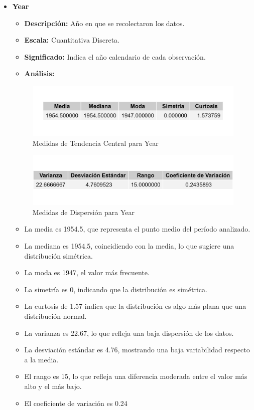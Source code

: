 \documentclass{article}
\begin{document}
\begin{itemize}
    \item \textbf{Year}
    \begin{itemize}
        \item \textbf{Descripción:} Año en que se recolectaron los datos.
        \item \textbf{Escala:} Cuantitativa Discreta.
        \item \textbf{Significado:} Indica el año calendario de cada observación.
        \item \textbf{Análisis:} 
    \end{itemize}
    \begin{figure}[H]
        \centering
        \includegraphics[width=\textwidth]{MTC/Year_central.png}
        \caption{Medidas de Tendencia Central para Year}
    \end{figure}
    \begin{figure}[H]
        \centering
        \includegraphics[width=\textwidth]{MTC/Year_dispersion.png}
        \caption{Medidas de Dispersión para Year}
    \end{figure}
            \begin{itemize}
                \item La media es 1954.5, que representa el punto medio del período analizado.
                \item La mediana es 1954.5, coincidiendo con la media, lo que sugiere una distribución simétrica.
                \item La moda es 1947, el valor más frecuente.
                \item La simetría es 0, indicando que la distribución es simétrica.
                \item La curtosis de 1.57 indica que la distribución es algo más plana que una distribución normal.
                \item La varianza es 22.67, lo que refleja una baja dispersión de los datos.
                \item La desviación estándar es 4.76, mostrando una baja variabilidad respecto a la media.
                \item El rango es 15, lo que refleja una diferencia moderada entre el valor más alto y el más bajo.
                \item El coeficiente de variación es 0.24%
            \end{itemize}
    

\end{itemize}
\end{document}
